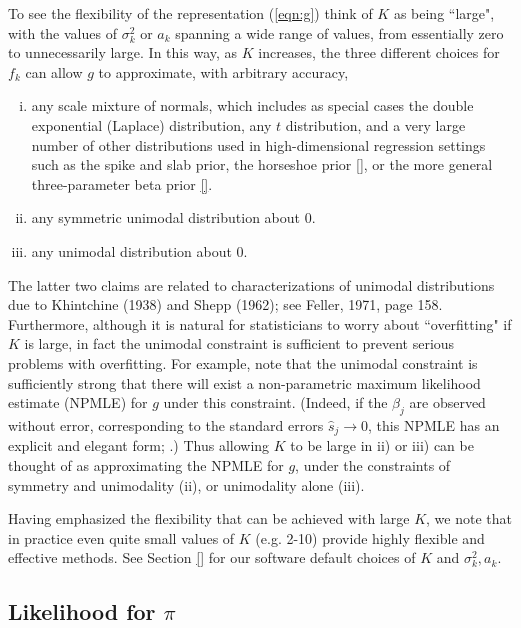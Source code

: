 \documentclass[11pt]{article}
\def\shat{\hat{s}}
\begin{document}
To see the flexibility of the representation (\ref{eqn:g})
think of $K$ as being ``large", with the values of $\sigma^2_k$ or $a_k$ 
spanning a wide range of values, from
essentially zero to unnecessarily large. In this way, as $K$ increases, the three different choices for $f_k$ can allow $g$ to approximate,
with arbitrary accuracy,
\begin{enumerate}[i)]
\item any scale mixture of normals, which includes as special cases
the double exponential (Laplace) distribution, any $t$ distribution, and a very large number of other distributions used in 
high-dimensional regression settings such as the spike and slab prior, the horseshoe prior \ref{}, or the more general three-parameter beta prior \ref{}.
\item any symmetric unimodal distribution about 0.
\item any unimodal distribution about 0.
\end{enumerate}
The latter two claims are related to characterizations of unimodal distributions due to Khintchine (1938) and  Shepp (1962); see Feller, 1971, page  158. 
Furthermore, although it is natural for statisticians to worry about ``overfitting" if $K$ is large, 
in fact the unimodal constraint is sufficient to prevent serious problems with overfitting. For example, note that the unimodal
constraint is sufficiently strong that there will exist a non-parametric
maximum likelihood estimate (NPMLE) for $g$ under this constraint. (Indeed, if the $\beta_j$ are observed without error, corresponding to the standard errors $\shat_j \rightarrow 0$, this NPMLE has an explicit and elegant form; \cite{grenander1956theory}.)
Thus allowing $K$ to be large in ii) or iii) can be thought of as approximating the NPMLE for $g$, under the constraints of symmetry and unimodality (ii), or unimodality alone (iii). 

Having emphasized the flexibility that can be achieved with large $K$, we note that in practice even quite small values of $K$ (e.g. 2-10) provide highly flexible
and effective methods. See Section \ref{} for our software default choices of $K$ and $\sigma^2_k,a_k$.


\subsection*{Likelihood for $\pi$}
\end{document}
